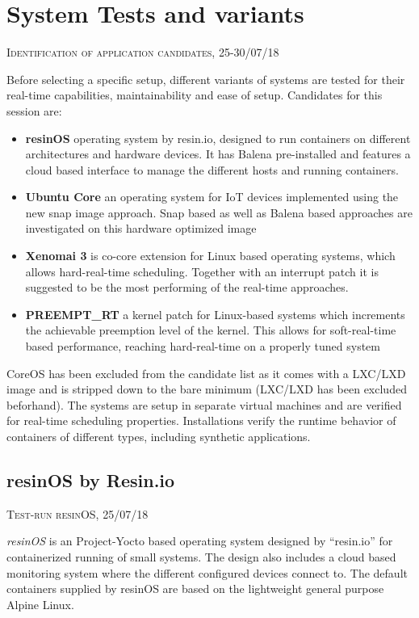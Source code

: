 \documentclass[]{scrartcl}
\begin{document}
\section{System Tests and variants}

{\small\textsc{Identification of application candidates, 25-30/07/18} \bigskip}

Before selecting a specific setup, different variants of systems are tested for their real-time capabilities, maintainability and ease of setup. Candidates for this session are:

\begin{itemize}
	\item \textbf{resinOS} operating system by resin.io, designed to run containers on different architectures and hardware devices. It has Balena pre-installed and features a cloud based interface to manage the different hosts and running containers.
	\item \textbf{Ubuntu Core} an operating system for IoT devices implemented using the new snap image approach. Snap based as well as Balena based approaches are investigated on this hardware optimized image
	\item \textbf{Xenomai 3} is co-core extension for Linux based operating systems, which allows hard-real-time scheduling. Together with an interrupt patch it is suggested to be the most performing of the real-time approaches.
	\item \textbf{PREEMPT\_RT} a kernel patch for Linux-based systems which increments the achievable preemption level of the kernel. This allows for soft-real-time based performance, reaching hard-real-time on a properly tuned system
\end{itemize}

CoreOS has been excluded from the candidate list as it comes with a LXC/LXD image and is stripped down to the bare minimum (LXC/LXD has been excluded beforhand). The systems are setup in separate virtual machines and are verified for real-time scheduling properties. Installations verify the runtime behavior of containers of different types, including synthetic applications.

\subsection{resinOS by Resin.io}

{\small\textsc{Test-run resinOS, 25/07/18} \bigskip}

\textit{resinOS} is an Project-Yocto based operating system designed by ``resin.io'' for containerized running of small systems. The design also includes a cloud based monitoring system where the different configured devices connect to. The default containers supplied by resinOS are based on the lightweight general purpose Alpine Linux.
\end{document}
